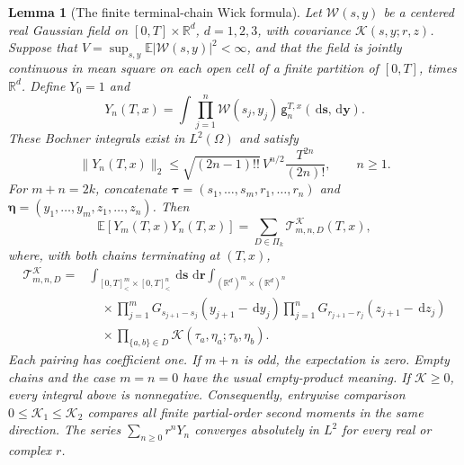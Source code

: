 \documentclass[12pt,oneside,openany]{book}
\numberwithin{equation}{section}
\newtheorem{lemma}[theorem]{Lemma}
\theoremstyle{nogostyle}
\theoremstyle{definition}
\newcommand{\R}{\mathbb{R}}
\newcommand{\E}{\mathbb{E}}
\newcommand{\ud}{\,\mathrm{d}}
\begin{document}
\begin{lemma}[The finite terminal-chain Wick formula]\label{L:terminal-wick}
  Let $\mathcal{W}(s,y)$ be a centered real Gaussian field on $[0,T]\times\R^d$,
  $d = 1,2,3$, with covariance $\mathcal{K}(s,y;r,z)$. Suppose that $V =
  \sup_{s,y}\E|\mathcal{W}(s,y)|^2 < \infty$, and that the field is jointly
  continuous in mean square on each open cell of a finite partition of $[0,T]$,
  times $\R^d$. Define $Y_0 = 1$ and
  \[
    Y_n(T,x)=\int\prod_{j=1}^n\mathcal{W}(s_j,y_j)
    \,\mathsf{g}_n^{T,x}(\ud\boldsymbol s,\ud\boldsymbol y).
  \]
  These Bochner integrals exist in $L^2(\Omega)$ and satisfy
  \begin{equation}\label{E:terminal-term-majorant}
    \|Y_n(T,x)\|_2
    \le\sqrt{(2n-1)!!}\,V^{n/2}\frac{T^{2n}}{(2n)!},
    \qquad n\ge1.
  \end{equation}
  For $m+n = 2k$, concatenate $\boldsymbol\tau =
  (s_1,\ldots,s_m,r_1,\ldots,r_n)$ and $\boldsymbol\eta =
  (y_1,\ldots,y_m,z_1,\ldots,z_n)$. Then
  \begin{equation}\label{E:terminal-wick-formula}
    \E[Y_m(T,x)Y_n(T,x)]
    =\sum_{D\in\Pi_k}\mathcal{T}_{m,n,D}^{\mathcal{K}}(T,x),
  \end{equation}
  where, with both chains terminating at $(T,x)$,
  \begin{equation}\label{E:terminal-pairing-integral}
    \begin{split}
      \mathcal{T}_{m,n,D}^{\mathcal{K}}
      ={}&\int_{[0,T]^m_<\times[0,T]^n_<}
      \ud\boldsymbol s\,\ud\boldsymbol r
      \int_{(\R^d)^m\times(\R^d)^n}\\
      &\quad\times\prod_{j=1}^m
      G_{s_{j+1}-s_j}(y_{j+1}-\ud y_j)
      \prod_{j=1}^n
      G_{r_{j+1}-r_j}(z_{j+1}-\ud z_j)\\
      &\quad\times\prod_{\{a,b\}\in D}
      \mathcal{K}(\tau_a,\eta_a;\tau_b,\eta_b).
    \end{split}
  \end{equation}
  Each pairing has coefficient one. If $m+n$ is odd, the expectation is zero.
  Empty chains and the case $m = n = 0$ have the usual empty-product meaning. If
  $\mathcal{K} \ge 0$, every integral above is nonnegative. Consequently,
  entrywise comparison $0 \le \mathcal{K}_1 \le \mathcal{K}_2$ compares all
  finite partial-order second moments in the same direction. The series
  $\sum_{n\ge0}r^nY_n$ converges absolutely in $L^2$ for every real or complex
  $r$.
\end{lemma}
\end{document}
